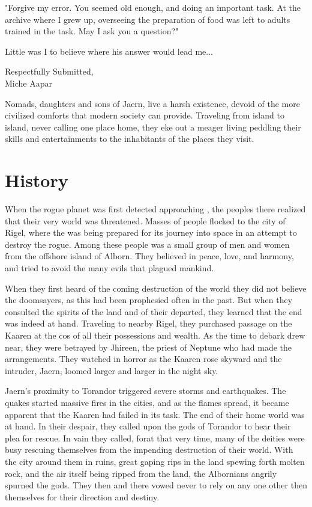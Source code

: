 \begin{multicols*}{2}
"Forgive my error. You seemed old enough, and doing an important task. At the archive where I grew up, overseeing the preparation of food was left to adults trained in the task. May I ask you a question?"

Little was I to believe where his answer would lead me...

\hspace*{\fill}Respectfully Submitted,\\
\hspace*{\fill}Miche Aapar

Nomads, daughters and sons of Jaern, live a harsh existence, devoid of the more civilized comforts that modern society can provide. Traveling from island to island, never calling one place home, they eke out a meager living peddling their skills and entertainments to the inhabitants of the places they visit.

\section{History}
When the rogue planet  was first detected approaching , the peoples there realized that their very world was threatened. Masses of people flocked to the city of Rigel, where the  was being prepared for its journey into space in an attempt to destroy the rogue. Among these people was a small group of men and women from the offshore island of Alborn. They believed in peace, love, and harmony, and tried to avoid the many evils that plagued mankind.

When they first heard of the coming destruction of the world they did not believe the doomsayers, as this had been prophesied often in the past. But when they consulted the spirits of the land and of their departed, they learned that the end was indeed at hand. Traveling to nearby Rigel, they purchased passage on the Kaaren at the cos of all their possessions and wealth. As the time to debark drew near, they were betrayed by Jhireen, the priest of Neptune who had made the arrangements. They watched in horror as the Kaaren rose skyward and the intruder, Jaern, loomed larger and larger in the night sky.

Jaern's proximity to Torandor triggered severe storms and earthquakes. The quakes started massive fires in the cities, and as the flames spread, it became apparent that the Kaaren had failed in its task. The end of their home world was at hand. In their despair, they called upon the gods of Torandor to hear their plea for rescue. In vain they called, forat that very time, many of the deities were busy rescuing themselves from the impending destruction of their world. With the city around them in ruins, great gaping rips in the land spewing forth molten rock, and the air itself being ripped from the land, the Albornians angrily spurned the gods. They then and there vowed never to rely on any one other then themselves for their direction and destiny.


\end{multicols*}
